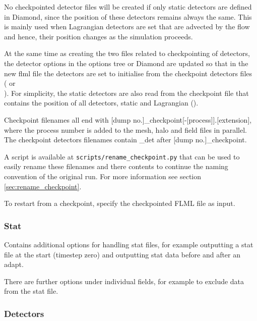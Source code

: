 No checkpointed detector files will be created if only static detectors are
defined in Diamond, since the position of these detectors remains always the
same. This is mainly used when Lagrangian detectors are set that are
advected by the flow and hence, their position changes as the simulation
proceeds.

At the same time as creating the two files related to checkpointing of
detectors, the detector options in the options tree or Diamond are updated
so that in the new flml file the detectors are set to initialise from the
checkpoint detectors files \\
( or \\
). For
simplicity, the static detectors are also read from the checkpoint file that
contains the position of all detectors, static and Lagrangian
().

Checkpoint filenames all end with [dump
no.]\_checkpoint[-[process]].[extension], where the process number is added
to the mesh, halo and field files in parallel.  The checkpoint detectors
filenames contain \_det after [dump no.]\_checkpoint. 

A script is available at \lstinline[language = bash]+scripts/rename_checkpoint.py+ 
that can be used to easily rename these filenames and there contents to continue 
the naming convention of the original run. For more information see section 
\ref{sec:rename_checkpoint}.

To restart from a checkpoint, specify the checkpointed FLML file as input.

\subsubsection{Stat}
Contains additional options for handling stat files, for example outputting
a stat file at the start (timestep zero) and outputting stat data before and
after an adapt.

There are further options under individual fields, for example to exclude data from the stat file.

\subsubsection{Detectors}
\label{detectors_options}


